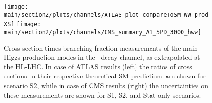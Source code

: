 \begin{figure}
  \centering
  \texttt{[image: \\main/section2/plots/channels/ATLAS\_plot\_compareToSM\_WW\_prodXS]}
  \texttt{[image: \\main/section2/plots/channels/CMS\_summary\_A1\_5PD\_3000\_hww]}
  \caption{Cross-section times branching fraction measurements of the main Higgs production modes in the \HWW\ decay channel, as extrapolated at the HL-LHC. In case of ATLAS results (left) the ratios of cross sections to their respective theoretical SM predictions are shown for scenario S2, while in case of CMS results (right) the uncertainties on these measurements are shown for S1, S2, and Stat-only scenarios.}
  \label{fig:HWW_ATLAS_HLLHC_S2}
\end{figure}
